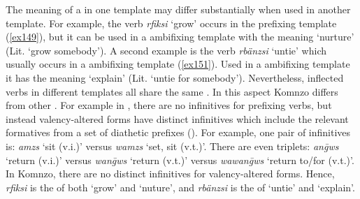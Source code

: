 The meaning of a  in one template may differ substantially when used in another template. For example, the verb \emph{rfiksi} `grow' occurs in the prefixing template (\ref{ex149}), but it can be used in a  ambifixing template with the meaning `nurture' (Lit. `grow somebody'). A second example is the verb \emph{rbänzsi} `untie' which usually occurs in a  ambifixing template (\ref{ex151}). Used in a  ambifixing template it has the meaning `explain' (Lit. `untie for somebody'). Nevertheless, inflected verbs in different templates all share the same . In this aspect Komnzo differs from other . For example in , there are no infinitives for prefixing verbs, but instead valency-altered forms have distinct infinitives which include the relevant formatives from a set of diathetic prefixes (\citealt{Evans:2015wy}). For example, one pair of infinitives is: \emph{amzs} `sit (v.i.)' versus \emph{wamzs} `set, sit (v.t.)'. There are even triplets: \emph{an\={g}ws} `return (v.i.)' versus \emph{wan\={g}ws} `return (v.t.)' versus \emph{wawan\={g}ws} `return to/for (v.t.)'. In Komnzo, there are no distinct infinitives for valency-altered forms. Hence, \emph{rfiksi} is the  of both `grow' and `nuture', and \emph{rbänzsi} is the  of `untie' and `explain'.\\

